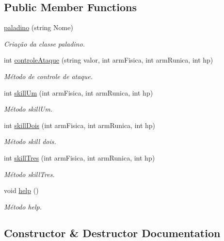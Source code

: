 \subsection*{Public Member Functions}
\begin{DoxyCompactItemize}
\item 
\mbox{\hyperlink{classpaladino_a312e5f9a43967aa31e34128051646277}{paladino}} (string Nome)
\begin{DoxyCompactList}\small\item\em Criação da classe paladino. \end{DoxyCompactList}\item 
int \mbox{\hyperlink{classpaladino_a059fd05922c2adcbd87743b9c3552c11}{controle\+Ataque}} (string valor, int arm\+Fisica, int arm\+Runica, int hp)
\begin{DoxyCompactList}\small\item\em Método de controle de ataque. \end{DoxyCompactList}\item 
int \mbox{\hyperlink{classpaladino_aaf70250e226146bab3bb421b253483d5}{skill\+Um}} (int arm\+Fisica, int arm\+Runica, int hp)
\begin{DoxyCompactList}\small\item\em Método skill\+Um. \end{DoxyCompactList}\item 
int \mbox{\hyperlink{classpaladino_a62a3129268222902926377c6dd0dceb5}{skill\+Dois}} (int arm\+Fisica, int arm\+Runica, int hp)
\begin{DoxyCompactList}\small\item\em Método skill dois. \end{DoxyCompactList}\item 
int \mbox{\hyperlink{classpaladino_acd4e68058d2504c07989af88ace6d57b}{skill\+Tres}} (int arm\+Fisica, int arm\+Runica, int hp)
\begin{DoxyCompactList}\small\item\em Método skill\+Tres. \end{DoxyCompactList}\item 
void \mbox{\hyperlink{classpaladino_a028019d72c919de0589cccdfed402a18}{help}} ()
\begin{DoxyCompactList}\small\item\em Método help. \end{DoxyCompactList}\end{DoxyCompactItemize}


\subsection{Constructor \& Destructor Documentation}
\mbox{\label{classpaladino_a312e5f9a43967aa31e34128051646277}} 
